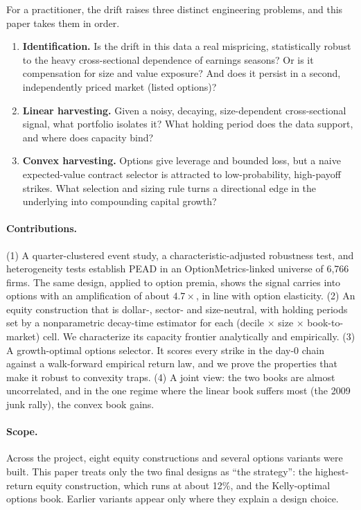 \documentclass[11pt]{article}
\theoremstyle{definition}
\newcommand{\1}{\mathbf{1}}
\begin{document}
For a practitioner, the drift raises three distinct engineering problems, and this paper
takes them in order.
\begin{enumerate}[label=(\roman*)]
  \item \textbf{Identification.} Is the drift in this data a real mispricing, statistically
        robust to the heavy cross-sectional dependence of earnings seasons? Or is it
        compensation for size and value exposure? And does it persist in a second,
        independently priced market (listed options)?
  \item \textbf{Linear harvesting.} Given a noisy, decaying, size-dependent cross-sectional
        signal, what portfolio isolates it? What holding period does the data support, and
        where does capacity bind?
  \item \textbf{Convex harvesting.} Options give leverage and bounded loss, but a naive
        expected-value contract selector is attracted to low-probability, high-payoff strikes.
        What selection and sizing rule turns a directional edge in the underlying into
        compounding capital growth?
\end{enumerate}

\paragraph{Contributions.}
(1) A quarter-clustered event study, a characteristic-adjusted robustness test, and
heterogeneity tests establish PEAD in an OptionMetrics-linked universe of 6{,}766
firms. The same design, applied to option premia, shows the signal carries into options
with an amplification of about $4.7\times$, in line with option elasticity.
(2) An equity construction that is dollar-, sector- and size-neutral, with holding periods
set by a nonparametric decay-time estimator for each (decile $\times$ size $\times$
book-to-market) cell. We characterize its capacity frontier analytically and empirically.
(3) A growth-optimal options selector. It scores every strike in the day-0 chain against a
walk-forward empirical return law, and we prove the properties that make it robust to
convexity traps.
(4) A joint view: the two books are almost uncorrelated, and in the one regime where the
linear book suffers most (the 2009 junk rally), the convex book gains.

\paragraph{Scope.} Across the project, eight equity constructions and several options
variants were built. This paper treats only the two final designs as ``the strategy'': the
highest-return equity construction, which runs at about 12\%, and the Kelly-optimal options
book. Earlier variants appear only where they explain a design choice.
\end{document}
